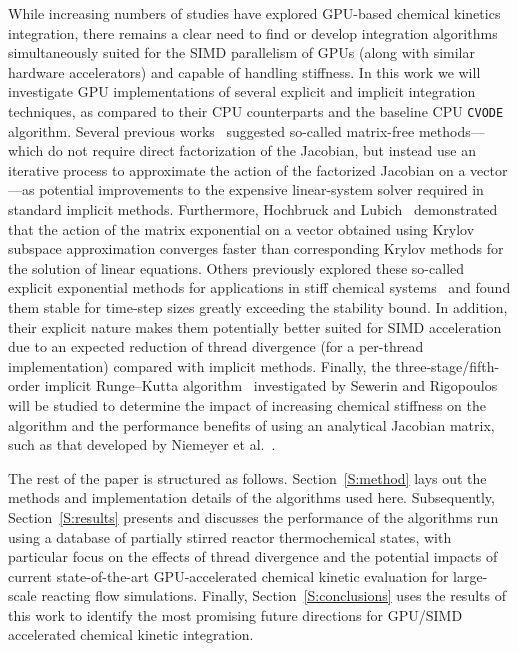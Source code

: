 \documentclass[preprint]{elsarticle}
\begin{document}
While increasing numbers of studies have explored GPU-based chemical kinetics integration, there remains a clear need to find or develop integration algorithms simultaneously suited for the SIMD parallelism of GPUs (along with similar hardware accelerators) and capable of handling stiffness.
In this work we will investigate GPU implementations of several explicit and implicit integration techniques, as compared to their CPU counterparts and the baseline CPU \texttt{CVODE}~\cite{Hindmarsh:2005hg} algorithm.
Several previous works~\cite{Perini20141180,McNenly2015581} suggested so-called matrix-free methods---which do not require direct factorization of the Jacobian, but instead use an iterative process to approximate the action of the factorized Jacobian on a vector---as potential improvements to the expensive linear-system solver required in standard implicit methods.
Furthermore, Hochbruck and Lubich~\cite{Hochbruck:1997} demonstrated that the action of the matrix exponential on a vector obtained using Krylov subspace approximation converges faster than corresponding Krylov methods for the solution of linear equations.
Others previously explored these so-called explicit exponential methods for applications in stiff chemical systems~\cite{Bisetti:2012jw,falati2011integration} and found them stable for time-step sizes greatly exceeding the stability bound.
In addition, their explicit nature makes them potentially better suited for SIMD acceleration due to an expected reduction of thread divergence (for a per-thread implementation) compared with implicit methods.
Finally, the three-stage\slash fifth-order implicit Runge--Kutta algorithm~\cite{wanner1991solving} investigated by Sewerin and Rigopoulos~\cite{Sewerin20151375} will be studied to determine the impact of increasing chemical stiffness on the algorithm and the performance benefits of using an analytical Jacobian matrix, such as that developed by Niemeyer et al.~\cite{niemeyer_2016_51139,Niemeyer:2015ws,Niemeyer:2016aa}.

The rest of the paper is structured as follows.
Section~\ref{S:method} lays out the methods and implementation details of the algorithms used here.
Subsequently, Section~\ref{S:results} presents and discusses the performance of the algorithms run using a database of partially stirred reactor thermochemical states, with particular focus on the effects of thread divergence and the potential impacts of current state-of-the-art GPU-accelerated chemical kinetic evaluation for large-scale reacting flow simulations.
Finally, Section~\ref{S:conclusions} uses the results of this work to identify the most promising future directions for GPU\slash SIMD accelerated chemical kinetic integration.
\end{document}
